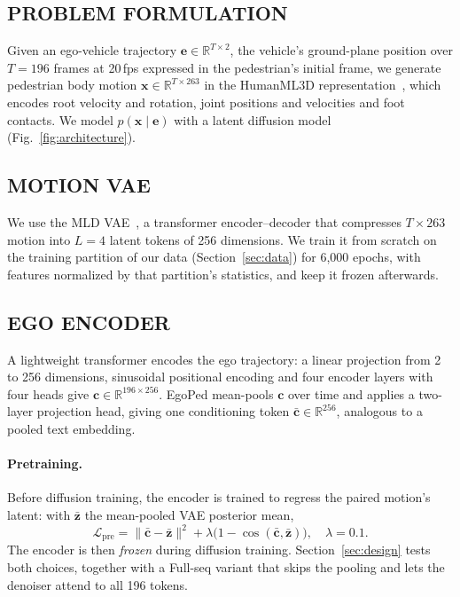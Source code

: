 \documentclass{ieeeoj}
\newcommand{\method}{EgoPed\xspace}
\newcommand{\fullseq}{Full-seq\xspace}
\begin{document}
\subsection{PROBLEM FORMULATION}

Given an ego-vehicle trajectory $\mathbf{e} \in \mathbb{R}^{T \times 2}$, the vehicle's ground-plane position over $T=196$ frames at 20\,fps expressed in the pedestrian's initial frame, we generate pedestrian body motion $\mathbf{x} \in \mathbb{R}^{T \times 263}$ in the HumanML3D representation~\cite{guo2022humanml3d}, which encodes root velocity and rotation, joint positions and velocities and foot contacts.
We model $p(\mathbf{x} \mid \mathbf{e})$ with a latent diffusion model (Fig.~\ref{fig:architecture}).

\subsection{MOTION VAE}

We use the MLD VAE~\cite{chen2023mld}, a transformer encoder--decoder that compresses $T \times 263$ motion into $L = 4$ latent tokens of 256 dimensions.
We train it from scratch on the training partition of our data (Section~\ref{sec:data}) for 6{,}000 epochs, with features normalized by that partition's statistics, and keep it frozen afterwards.

\subsection{EGO ENCODER}
\label{sec:egoencoder}

A lightweight transformer encodes the ego trajectory: a linear projection from 2 to 256 dimensions, sinusoidal positional encoding and four encoder layers with four heads give $\mathbf{c} \in \mathbb{R}^{196 \times 256}$.
\method mean-pools $\mathbf{c}$ over time and applies a two-layer projection head, giving one conditioning token $\bar{\mathbf{c}} \in \mathbb{R}^{256}$, analogous to a pooled text embedding.

\paragraph{Pretraining.}
Before diffusion training, the encoder is trained to regress the paired motion's latent: with $\bar{\mathbf{z}}$ the mean-pooled VAE posterior mean,
\begin{equation}
  \mathcal{L}_{\mathrm{pre}} = \|\bar{\mathbf{c}} - \bar{\mathbf{z}}\|^2 + \lambda\bigl(1 - \cos(\bar{\mathbf{c}}, \bar{\mathbf{z}})\bigr), \quad \lambda = 0.1 .
\end{equation}
The encoder is then \emph{frozen} during diffusion training.
Section~\ref{sec:design} tests both choices, together with a \fullseq variant that skips the pooling and lets the denoiser attend to all 196 tokens.
\end{document}
